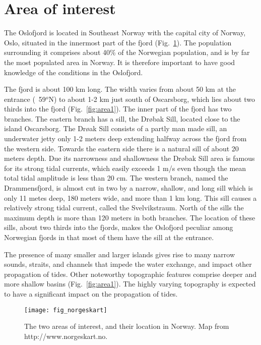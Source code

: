 \section{Area of interest}

The Oslofjord is located in Southeast Norway with the capital city of Norway, Oslo, situated in the innermost part of the fjord (Fig.~\ref{fig:area0}). The population surrounding it comprises about 40\% of the Norwegian population, and is by far the most populated area in Norway. It is therefore important to have good knowledge of the conditions in the Oslofjord. 

The fjord is about 100 km long. The width varies from about 50 km at the entrance (~59$^o$N) to about 1-2 km just south of Oscarsborg, which lies about two thirds into the fjord (Fig.~\ref{fig:area1}). 
The inner part of the fjord has two branches. 
The eastern branch has a sill, the Dr{\o}bak Sill, located close to the island Oscarsborg. The Dr{\o}ak Sill consists of a partly man made sill, an underwater jetty only 1-2 meters deep extending halfway across the fjord from the western side. Towards the eastern side there is a natural sill of about 20 meters depth. Due its narrowness and shallowness the Dr{\o}bak Sill area is famous for its strong tidal currents, which easily exceeds 1 m/s even though the mean total tidal amplitude is less than 20 cm. 
The western branch, named the Drammensfjord, is almost cut in two by a narrow, shallow, and long sill which is only 11 metes deep, 180 meters wide, and more than 1 km long. This sill causes a relatively strong tidal current, called the Svelvikstraum.
North of the sills the maximum depth is more than 120 meters in both branches. 
The location of these sills, about two thirds into the fjords, makes the Oslofjord peculiar among Norwegian fjords in that most of them have the sill at the entrance.

The presence of many smaller and larger islands gives rise to many narrow sounds, straits, and channels that impede the water exchange, and impact other propagation of tides. Other noteworthy topographic features comprise deeper and more shallow basins (Fig.~\ref{fig:area1}). The highly varying topography is expected to have a significant impact on the propagation of tides.


\begin{figure}[htb]
\centering
\texttt{[image: fig\_norgeskart]}
\caption{The two areas of interest, and their location in Norway. Map from http://www.norgeskart.no.}
\label{fig:area0}
\end{figure}


